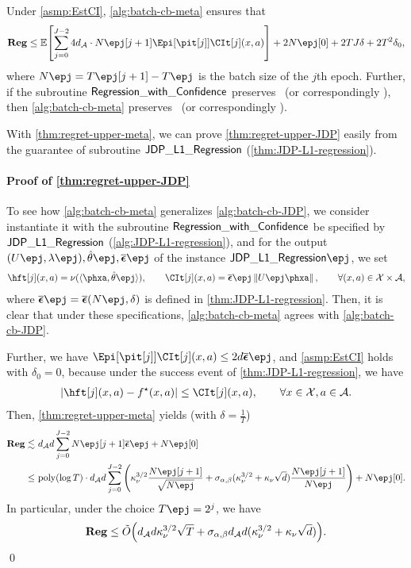 \begin{theorem}\label{thm:regret-upper-meta}
Under \cref{asmp:EstCI}, \cref{alg:batch-cb-meta} ensures that
\begin{align*}
    \Reg\leq \EE\brac{ \sum_{j=0}^{J-2} 4\dA\cdot N\epj[j+1] \Epi[{\pit[j]}]{ \CIt[j](x,a) } } + 2N\epj[0] + 2TJ\delta+ 2T^2\delta_0,
\end{align*}
where $N\epj=T\epj[j+1]-T\epj$ is the batch size of the $j$th epoch. Further, if the subroutine $\mathsf{Regression\_with\_Confidence}$ preserves \aJDP~(or correspondingly \aLDP), then \cref{alg:batch-cb-meta} preserves \aJDP~(or correspondingly \aLDP).
\end{theorem}

With \cref{thm:regret-upper-meta}, we can prove \cref{thm:regret-upper-JDP} easily from the guarantee of subroutine $\mathsf{JDP\_L1\_Regression}$ (\cref{thm:JDP-L1-regression}).
\paragraph{Proof of \cref{thm:regret-upper-JDP}}
To see how \cref{alg:batch-cb-meta} generalizes \cref{alg:batch-cb-JDP}, we consider instantiate it with the subroutine $\mathsf{Regression\_with\_Confidence}$ be specified by $\mathsf{JDP\_L1\_Regression}$ (\cref{alg:JDP-L1-regression}), and for the output $(U\epj,\lambda\epj), \hth\epj, \lamall\epj$ of the instance $\AlgJDPRegression\epj$, we set
\begin{align*}
    \hft[j](x,a)=\nu(\lr \phxa, \hth\epj \rr), \qquad
    \CIt[j](x,a)=\lamall \epj \nrm{U\epj \phxa}, \qquad \forall (x,a)\in\cX\times\cA,
\end{align*}
where $\lamall\epj=\lamall(N\epj, \delta)$ is defined in \cref{thm:JDP-L1-regression}.
Then, it is clear that under these specifications, \cref{alg:batch-cb-meta} agrees with \cref{alg:batch-cb-JDP}. 

Further, we have $\Epi[{\pit[j]}]{ \CIt[j](x,a) }\leq 2d\lamall\epj$, and \cref{asmp:EstCI} holds with $\delta_0=0$, because under the success event of \cref{thm:JDP-L1-regression}, we have
\begin{align*}
    \abs{ \hft[j](x,a)-\fs(x,a) }\leq \CIt[j](x,a), \qquad \forall x\in\cX, a\in\cA.
\end{align*}
Then, \cref{thm:regret-upper-meta} yields (with $\delta=\frac1T$)
\begin{align*}
    \Reg\leqsim&~ \dA d\sum_{j=0}^{J-2} N\epj[j+1] \lamall\epj +N\epj[0] \\
    \leq&~ \poly(\log T)\cdot  \dA d\sum_{j=0}^{J-2} \paren{ \kpg^{3/2} \frac{N\epj[j+1]}{\sqrt{N\epj}}+\siga(\kpg^{3/2}+\kpg\sqrt{d})\frac{N\epj[j+1]}{N\epj} } + N\epj[0].
\end{align*}
In particular, under the choice $T\epj=2^{j}$, we have 
\begin{align*}
    \mathbf{Reg}\leq \tilde{O}{\left( d_{\mathcal{A}} d \kappa_\nu^{3/2} \sqrt{T} + \sigma_{\alpha,\beta} d_{\mathcal{A}} d(\kappa_\nu^{3/2}+\kappa_\nu\sqrt{d}) \right)}.
\end{align*}
\qed

